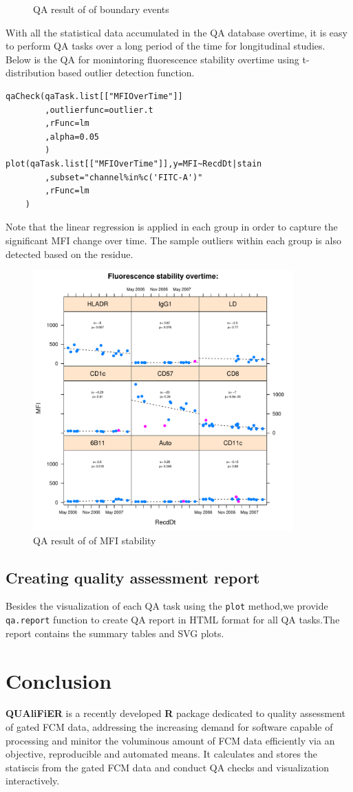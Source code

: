 \documentclass[10pt]{bmc_article}
\newenvironment{bmcformat}{\baselineskip20pt\sloppy\setboolean{publ}{false}}{\baselineskip20pt\sloppy}
\begin{document}
\begin{bmcformat}
\begin{figure}[h]
\caption{QA result of of boundary events} 
\end{figure}
\clearpage
With all the statistical data accumulated in the QA database overtime, it is
easy to perform QA tasks over a long period of the time for longitudinal
studies. Below is the QA for monintoring fluorescence stability overtime using
t-distribution based outlier detection function.
\begin{verbatim}
qaCheck(qaTask.list[["MFIOverTime"]]
		,outlierfunc=outlier.t
		,rFunc=lm
		,alpha=0.05
		)
plot(qaTask.list[["MFIOverTime"]],y=MFI~RecdDt|stain
		,subset="channel%in%c('FITC-A')"
		,rFunc=lm
	)
\end{verbatim}
Note that the linear regression is applied in each group in order to capture the significant MFI change over time.
The sample outliers within each group is also detected based on the residue.
\begin{figure}[h]
\includegraphics[height=100mm]{image/MFI.pdf}
\caption{QA result of of MFI stability} 
\end{figure}
\clearpage
\subsection{Creating quality assessment report}
Besides the visualization of each QA
task using the \texttt{plot} method,we provide \texttt{qa.report} function
to create QA report in HTML format for all QA tasks.The report contains the
summary tables and SVG plots.

\section*{Conclusion}
\textbf{QUAliFiER} is a recently developed \textbf{R} package dedicated to
quality assessment of gated FCM data, addressing the increasing demand for
software capable of processing and minitor the voluminous amount of FCM data
efficiently via an objective, reproducible and automated means. 
 It calculates and stores the statiscis from the gated FCM data and conduct
 QA checks and visualization interactively.


\end{bmcformat}
\end{document}
